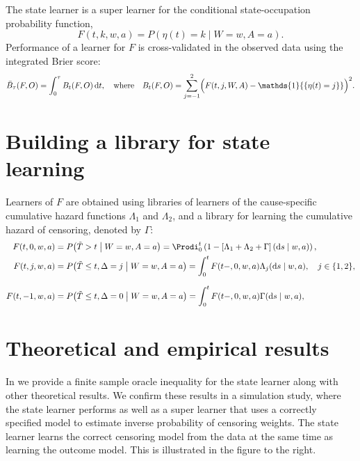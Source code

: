 \documentclass[a0,portrait]{a0poster}
\newcommand*\diff{\mathop{}\!\mathrm{d}}
\newcommand{\midd}{\; \middle|\;}
\newcommand{\1}{\mathds{1}}
\begin{document}
\begin{minipage}{\textwidth}
\begin{minipage}[t]{1\linewidth}
\begin{multicols}{2}
\vspace{1cm}

The state learner is a super learner for the conditional state-occupation
probability function, 
\begin{equation*}
  F(t, k, w,a) = P(\eta(t) = k \mid W=w, A=a).
\end{equation*}
Performance of a learner for \( F \) is cross-validated in the
observed data using the integrated Brier score:
\begin{equation*}
  \bar B_\tau( F,O) = \int_0^{\tau} B_t(F,O) \diff t,
  \quad \text{where} \quad 
  B_t(F,O) = \sum_{j=-1}^{2}
  \Bigl(
    F(t,j,W,A) - \1{\{\eta(t)=j\}}
  \Bigr)^2.
\end{equation*}

\section*{Building a library for state learning}

Learners of \( F \) are obtained using libraries of learners of the
cause-specific cumulative hazard functions \( \Lambda_{1} \) and
\( \Lambda_{2} \), and a library for learning the cumulative hazard of
censoring, denoted by $\Gamma$:
\begin{align*}
  F(t, 0, w,a)
  &= P{\left( \tilde{T}>t \midd W=w,A=a \right)}
    = \Prodi_0^t
    \left( 1 - 
    \left[\Lambda_{1} + \Lambda_{2} + \Gamma
    \right](\diff s \mid w,a) \right),
  \\
  F(t, j, w,a)
  & = P{\left(
    \tilde{T} \leq t, \Delta=j \midd W=w, A=a
    \right)}
    = \int_0^t F(t-,0, w,a)  \Lambda_{j}(\diff s \mid w,a),
    \quad  j \in \{1,2\},
  \\[.7em]
  F(t, -1, w,a)
  & =
    P{\left( \tilde{T} \leq t, \Delta=0 \midd W=w, A=a \right)}
    = \int_0^tF(t-,0, w,a)  \Gamma(\diff s \mid w,a),
\end{align*}

  \section*{Theoretical and empirical results}
  \vspace{-.7em}
  \setlength{\columnseprule}{0pt} \setlength{\columnsep}{30pt}
\begin{multicols}{2}
  In \cite{munch2024} we provide a finite sample oracle inequality for the state
  learner along with other theoretical results. We confirm these results in a
  simulation study, where the state learner performs as well as a super learner
  that uses a correctly specified model to estimate inverse probability of
  censoring weights. The state learner learns the correct censoring model from
  the data at the same time as learning the outcome model. This is illustrated
  in the figure to the right.


\end{multicols}
\end{multicols}
\end{minipage}
\end{minipage}
\end{document}
